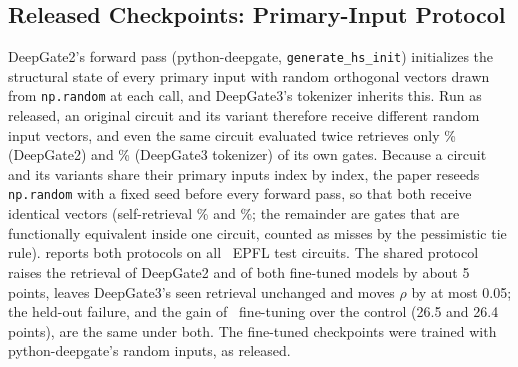 \begin{table}[h]
\centering\scriptsize
\caption{Phase hints in CaDiCaL: geometric-mean ratio of conflicts (+1) over the \PhInst\ instances (hard: the \PhHard\
needing at least 1{,}000 conflicts by default). Left: hints against no hints ($>1$: more conflicts). Right: each model's
own hints against its consistent hints on the rewritten implementations ($>1$: inconsistency costs conflicts).
$\theta=0.01$ unless marked.}
\label{tab:app_solver}
\resizebox{0.72\columnwidth}{!}{}
\end{table}

\subsection{Released Checkpoints: Primary-Input Protocol}\label{app:pi}
\begin{table}[h]
\centering\small
\caption{Public-checkpoint audit under both primary-input protocols, CPU run (fine-tuned rows: mean of 2 seeds; the
GPU run of \cref{tab:general} uses 5; self Top-1: the same circuit against itself).}\label{tab:piprotocol}

\end{table}
DeepGate2's forward pass (python-deepgate, \texttt{generate\_hs\_init}) initializes the structural state of every
primary input with random orthogonal vectors drawn from \texttt{np.random} at each call, and DeepGate3's tokenizer
inherits this. Run as released, an original circuit and its variant therefore receive different random input
vectors, and even the same circuit evaluated twice retrieves only \DTwoSelfRand\% (DeepGate2) and \DThreeSelfRand\%
(DeepGate3 tokenizer) of its own gates. Because a circuit and its variants share their primary inputs index by index,
the paper reseeds \texttt{np.random} with a fixed seed before every forward pass, so that both receive identical
vectors (self-retrieval \DTwoSelfShared\% and \DThreeSelfShared\%; the remainder are gates that are functionally
equivalent inside one circuit, counted as misses by the pessimistic tie rule). \Cref{tab:piprotocol} reports both
protocols on all \NTestCones\ EPFL test circuits. The shared protocol raises the retrieval of DeepGate2 and of both
fine-tuned models by about 5 points, leaves DeepGate3's seen retrieval unchanged and moves $\rho$ by at most 0.05; the
held-out failure, and the gain of \ours\ fine-tuning over the control (26.5 and 26.4 points), are the same under both. The fine-tuned checkpoints were trained with python-deepgate's random inputs, as released.

